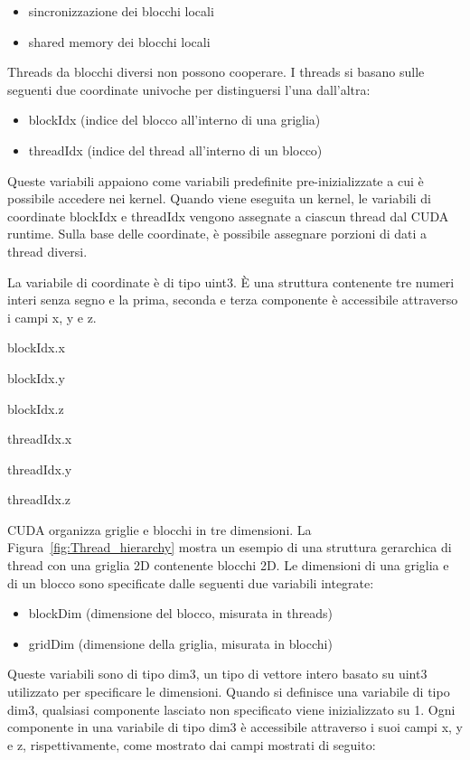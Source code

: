 \begin{itemize}
	\item sincronizzazione dei blocchi locali
	\item shared memory dei blocchi locali
\end{itemize}
Threads da blocchi diversi non possono cooperare. I threads si basano sulle seguenti due coordinate univoche per distinguersi l'una dall'altra:
\begin{itemize}
	\item blockIdx (indice del blocco all'interno di una griglia)
	\item threadIdx (indice del thread all'interno di un blocco)
\end{itemize}
Queste variabili appaiono come variabili predefinite pre-inizializzate a cui è possibile accedere nei kernel. Quando viene eseguita un kernel, le variabili di coordinate blockIdx e threadIdx vengono assegnate a ciascun thread dal CUDA runtime. Sulla base delle coordinate, è possibile assegnare porzioni di dati a thread diversi.

La variabile di coordinate è di tipo uint3. È una struttura contenente tre numeri interi senza segno e la prima, seconda e terza componente è accessibile attraverso i campi x, y e z.

blockIdx.x

blockIdx.y

blockIdx.z

threadIdx.x

threadIdx.y

threadIdx.z

CUDA organizza griglie e blocchi in tre dimensioni. La Figura~\ref{fig:Thread_hierarchy} mostra un esempio di una struttura gerarchica di thread con una griglia 2D contenente blocchi 2D. Le dimensioni di una griglia e di un blocco sono specificate dalle seguenti due variabili integrate:
\begin{itemize}
	\item blockDim (dimensione del blocco, misurata in threads)
	\item gridDim (dimensione della griglia, misurata in blocchi)
\end{itemize}
Queste variabili sono di tipo dim3, un tipo di vettore intero basato su uint3 utilizzato per specificare le dimensioni. Quando si definisce una variabile di tipo dim3, qualsiasi componente lasciato non specificato viene inizializzato su 1. Ogni componente in una variabile di tipo dim3 è accessibile attraverso i suoi campi x, y e z, rispettivamente, come mostrato dai campi mostrati di seguito:

